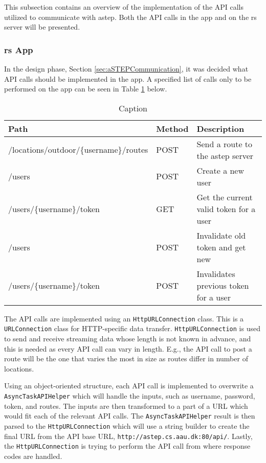 This subsection contains an overview of the implementation of the API calls utilized to communicate with \gls{astep}.
Both the API calls in the app and on the \gls{rs} server will be presented.

\subsubsection{\gls{rs} App}
In the design phase, Section \ref{sec:aSTEPCommunication}, it was decided what API calls should be implemented in the app.
A specified list of calls only to be performed on the app can be seen in Table \ref{tab:asteprequests} below.

\begin{table}[h]
	\centering
	\scriptsize
	\begin{tabular}{l l l}
		Path & Method & Description\\\midrule
		/locations/outdoor/\{username\}/routes & POST & Send a route to the \gls{astep} server\\
		/users & POST & Create a new user\\
		/users/\{username\}/token & GET & Get the current valid token for a user\\
		/users & POST & Invalidate old token and get new\\
		/users/\{username\}/token & POST & Invalidates previous token for a user\\
	\end{tabular}
	\caption{Caption}
	\label{tab:asteprequests}
\end{table} 

The API calls are implemented using an \texttt{HttpURLConnection} class.
This is a \texttt{URLConnection} class for HTTP-specific data transfer.
\texttt{HttpURLConnection} is used to send and receive streaming data whose length is not known in advance, and this is needed as every API call can vary in length.
E.g., the API call to post a route will be the one that varies the most in size as routes differ in number of locations.

Using an object-oriented structure, each API call is implemented to overwrite a \texttt{AsyncTaskAPIHelper} which will handle the inputs, such as username, password, token, and routes.
The inputs are then transformed to a part of a URL which would fit each of the relevant API calls.
The \texttt{AsyncTaskAPIHelper} result is then parsed to the \texttt{HttpURLConnection} which will use a string builder to create the final URL from the API base URL, \texttt{http://astep.cs.aau.dk:80/api/}.
Lastly, the \texttt{HttpURLConnection} is trying to perform the API call from where response codes are handled.

